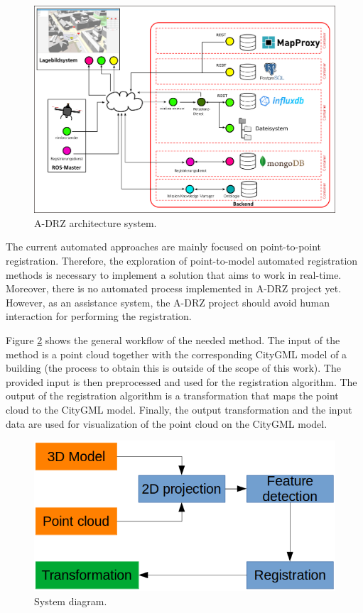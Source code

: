         \begin{figure}[H]
            \includegraphics[width=\textwidth]{images/Systemaufbau.png}
            \caption{A-DRZ architecture system.}
            \label{fig:adrz}
        \end{figure}

        The current automated approaches are mainly focused on point-to-point registration.
        Therefore, the exploration of point-to-model automated registration methods is necessary to implement a solution that aims to work in real-time.
        Moreover, there is no automated process implemented in A-DRZ project yet. 
        However, as an assistance system, the A-DRZ project should avoid human interaction for performing the registration.

        Figure \ref{fig:system_diagram} shows the general workflow of the needed method.
        The input of the method is a point cloud together with the corresponding CityGML model of a building  
        (the process to obtain this is outside of the scope of this work).
        The provided input is then preprocessed and used for the registration algorithm.
        The output of the registration algorithm is a transformation that maps the point cloud to the CityGML model.
        Finally, the output transformation and the input data are used for visualization of the point cloud on the CityGML model.

        \begin{figure}[H]
            \centering
            \includegraphics[scale=0.5]{images/RegistrationProcess}
            \caption{System diagram.}
            \label{fig:system_diagram}
        \end{figure}

